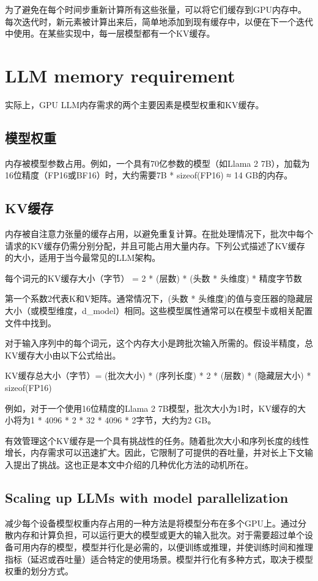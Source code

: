 \documentclass[twocolumn, 10pt]{article} %
\theoremstyle{remark}
\begin{document}
为了避免在每个时间步重新计算所有这些张量，可以将它们缓存到GPU内存中。每次迭代时，新元素被计算出来后，简单地添加到现有缓存中，以便在下一个迭代中使用。在某些实现中，每一层模型都有一个KV缓存。



\section{LLM memory requirement }


实际上，GPU LLM内存需求的两个主要因素是模型权重和KV缓存。

\subsection{模型权重}
内存被模型参数占用。例如，一个具有70亿参数的模型（如Llama 2 7B），加载为16位精度（FP16或BF16）时，大约需要7B * sizeof(FP16) ≈ 14 GB的内存。

\subsection{KV缓存}
内存被自注意力张量的缓存占用，以避免重复计算。在批处理情况下，批次中每个请求的KV缓存仍需分别分配，并且可能占用大量内存。下列公式描述了KV缓存的大小，适用于当今最常见的LLM架构。

每个词元的KV缓存大小（字节） = 2 * (层数) * (头数 * 头维度) * 精度字节数

第一个系数2代表K和V矩阵。通常情况下，(头数 * 头维度)的值与变压器的隐藏层大小（或模型维度，d\_model）相同。这些模型属性通常可以在模型卡或相关配置文件中找到。

对于输入序列中的每个词元，这个内存大小是跨批次输入所需的。假设半精度，总KV缓存大小由以下公式给出。

KV缓存总大小（字节）= (批次大小) * (序列长度) * 2 * (层数) * (隐藏层大小) * sizeof(FP16)

例如，对于一个使用16位精度的Llama 2 7B模型，批次大小为1时，KV缓存的大小将为1 * 4096 * 2 * 32 * 4096 * 2字节，大约为2 GB。

有效管理这个KV缓存是一个具有挑战性的任务。随着批次大小和序列长度的线性增长，内存需求可以迅速扩大。因此，它限制了可提供的吞吐量，并对长上下文输入提出了挑战。这也正是本文中介绍的几种优化方法的动机所在。

\subsection{Scaling up LLMs with model parallelization}
减少每个设备模型权重内存占用的一种方法是将模型分布在多个GPU上。通过分散内存和计算负担，可以运行更大的模型或更大的输入批次。对于需要超过单个设备可用内存的模型，模型并行化是必需的，以便训练或推理，并使训练时间和推理指标（延迟或吞吐量）适合特定的使用场景。模型并行化有多种方式，取决于模型权重的划分方式。
\end{document}
